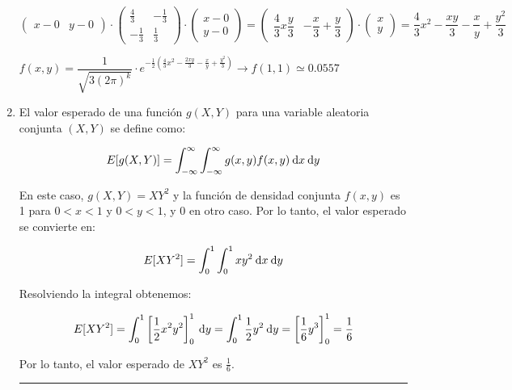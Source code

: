 \begin{enumerate}[label=\color{red}\arabic*), leftmargin=*]
	$\begin{pmatrix}
	x-0 & y-0
	\end{pmatrix}\cdot\begin{pmatrix}
		\tfrac{4}{3} & -\tfrac{1}{3}\\
		-\tfrac{1}{3} & \tfrac{1}{3}
		\end{pmatrix}\cdot\begin{pmatrix}
		x-0\\
		y-0
		\end{pmatrix}=\begin{pmatrix}
		\dfrac{4}{3}x\dfrac{y}{3} & -\dfrac{x}{3}+\dfrac{y}{3}
		\end{pmatrix}\cdot\begin{pmatrix}
		x\\
		y
		\end{pmatrix}=\dfrac{4}{3}x^2-\dfrac{xy}{3}-\dfrac{x}{y}+\dfrac{y^2}{3}$
		
		$f(x,y)=\dfrac{1}{\sqrt{3(2\pi)^k}}\cdot e^{-\frac{1}{2}\left(\frac{4}{3}x^2-\frac{2xy}{3}-\frac{x}{y}+\frac{y^2}{3}\right)}\longrightarrow f(1,1)\simeq0.0557$
	\item {}
	
	El valor esperado de una función $g(X,Y)$ para una variable aleatoria conjunta $(X,Y)$ se define como:
	
	$$E[g(X,Y)] = \int_{-\infty}^{\infty} \int_{-\infty}^{\infty} g(x,y) f(x,y) \:\mathrm{d}x \:\mathrm{d}y$$
	
	En este caso, $g(X,Y) = XY^2$ y la función de densidad conjunta $f(x,y)$ es 1 para $0<x<1$ y $0<y<1$, y 0 en otro caso. Por lo tanto, el valor esperado se convierte en:
	
	$$E[XY^2] = \int_{0}^{1} \int_{0}^{1} xy^2 \:\mathrm{d}x \:\mathrm{d}y$$
	
	Resolviendo la integral obtenemos:
	
	$$E[XY^2] = \int_{0}^{1} \left[ \frac{1}{2}x^2y^2 \right]_{0}^{1} \:\mathrm{d}y = \int_{0}^{1} \frac{1}{2}y^2 \:\mathrm{d}y = \left[ \frac{1}{6}y^3 \right]_{0}^{1} = \frac{1}{6}$$
	
	Por lo tanto, el valor esperado de $XY^2$ es $\frac{1}{6}$.
	
	\hrule
	

\end{enumerate}
